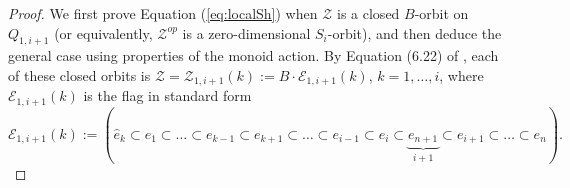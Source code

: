\documentclass[12pt]{amsart}
\numberwithin{equation}{section}
\newcommand{\cZ}{{\mathcal Z}}
\newcommand{\fg}{\mbox{${\mathfrak g}$}}
\newcommand{\B}{\mathcal{B}}
\newcommand{\F}{\mathcal{F}}
\begin{document}
\begin{proof}
  We first prove Equation (\ref{eq:localSh})  when $\cZ$ is a closed $B$-orbit on $Q_{1,i+1}$ (or equivalently, $\cZ^{op}$ is a zero-dimensional $S_i$-orbit), and then deduce the general case using properties of the monoid action.  
By Equation (6.22) of \cite{CE21II},  each of these closed orbits  is 
$\cZ={\cZ}_{1,i+1}(k):=B\cdot \mathcal{E}_{1,i+1}(k)$, $k=1,\dots, i$, where $\mathcal{E}_{1,i+1}(k)$ is the flag in standard form 
\begin{equation}\label{eq:firststd}
 \mathcal{E}_{1,i+1}(k):=(\hat{e}_{k}\subset e_{1}\subset \dots\subset e_{k-1}\subset e_{k+1}\subset\dots\subset e_{i-1}\subset e_{i}\subset \underbrace{e_{n+1}}_{i+1}\subset e_{i+1}\subset \dots\subset e_{n}). 
\end{equation}

\end{proof}
\end{document}
